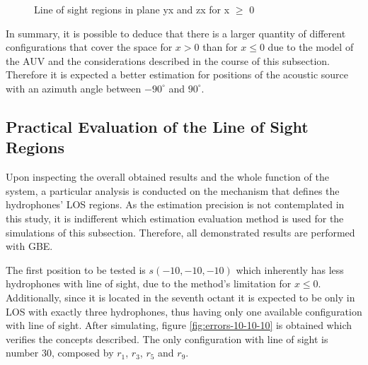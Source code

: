 \begin{figure}[!htbp]
	\captionsetup{justification=centering,margin=2cm}
	\caption{Line of sight regions in plane yx and zx for x $\geq$ 0}
	\label{fig:los-color-b0}
\end{figure}

In summary, it is possible to deduce that there is a larger quantity of different configurations that cover the space for $x>0$ than for $x \leq 0$ due to the model of the AUV and the considerations described in the course of this subsection. Therefore it is expected a better estimation for positions of the acoustic source with an azimuth angle between $-90^{\circ}$ and $90^{\circ}$.

\subsection{Practical Evaluation of the Line of Sight Regions}	

Upon inspecting the overall obtained results and the whole function of the system, a particular analysis is conducted on the mechanism that defines the hydrophones' LOS regions. As the estimation precision is not contemplated in this study, it is indifferent which estimation evaluation method is used for the simulations of this subsection. Therefore, all demonstrated results are performed with GBE.

The first position to be tested is $s(-10,-10,-10)$ which inherently has less hydrophones with line of sight, due to the method's limitation for $x \leq 0$. Additionally, since it is located in the seventh octant it is expected to be only in LOS with exactly three hydrophones, thus having only one available configuration with line of sight. After simulating, figure \ref{fig:errors-10-10-10} is obtained which verifies the concepts described. The only configuration with line of sight is number 30, composed by $r_1$, $r_3$, $r_5$ and $r_9$.

